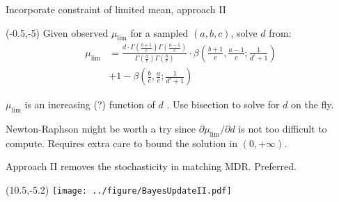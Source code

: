 \documentclass[aspectratio=169]{beamer}
\begin{document}
\begin{frame}{Incorporate constraint of limited mean, approach II}
\begin{textblock}{9}(-0.5,-5)
Given observed $\mu_{\text{lim}}$ for a sampled $(a, b, c)$, solve $d$ from:
\begin{equation*}
\begin{split}
\mu_{\text{lim}} &= \frac{ d \cdot  \Gamma\left(  \frac{b + 1}{c}  \right)\Gamma\left(   \frac{a-1}{c} \right)  }{\Gamma\left(    \frac{a}{c}  \right) \Gamma\left( \frac{b}{c} \right) }\cdot \beta \left( \frac{b+1}{c}  ,  \frac{a-1}{c} ;   \frac{1}{d^c+1}  \right)\\
&+1 - \beta \left( \frac{b}{c} , \frac{a}{c} ; \frac{1}{d^c+1} \right)
\end{split}
\end{equation*}

$\mu_{\text{lim}}$ is an increasing (?) function of $d$ . Use bisection to solve for $d$ on the fly.\medskip

Newton-Raphson might be worth a try since $ \partial \mu_{\text{lim}}/\partial d$ is not too difficult to compute. Requires extra care to bound the solution in $(0,+\infty)$.\medskip

Approach II removes the stochasticity in matching MDR. Preferred. 
\end{textblock}


\begin{textblock}{1}(10.5,-5.2)
\texttt{[image: ../figure/BayesUpdateII.pdf]}
\end{textblock}
\end{frame}
\end{document}
